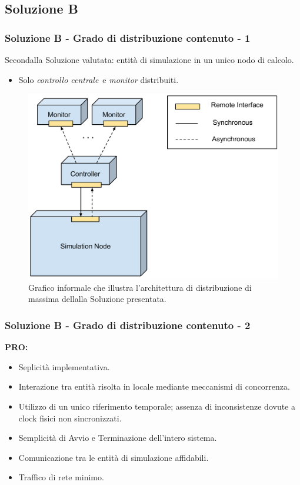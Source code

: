 \documentclass[slidestop,compress,blackandwhite]{beamer}
\newcommand{\ii}[1]{\textit{#1}}
\newcommand{\controller}{\ii{controllo centrale}}
\newcommand{\PRO}{\textbf{PRO:}}
\newcommand{\newframe}[2]{\begin{frame}\frametitle{#1}#2\end{frame}}
\begin{document}
	\subsection{Soluzione B}
	\newframe{Soluzione B - Grado di distribuzione contenuto - 1}{
		Secondalla Soluzione valutata: entità di simulazione in un unico nodo di calcolo.
		\begin{itemize}
			\item Solo \controller~e \ii{monitor} distribuiti.
		\end{itemize}
		
		\begin{figure}
			\includegraphics[scale=0.22,trim=0mm 5mm 0mm 0mm]{imgs/nothing_distributed.pdf}
			\caption{\small Grafico informale che illustra l'architettura di distribuzione di massima dellalla Soluzione presentata.}
		\end{figure}
		
	}
	
	\newframe{Soluzione B - Grado di distribuzione contenuto - 2}{
		\vspace{0.5cm}
		\PRO
			\begin{itemize}
				\item Seplicità implementativa.
				\item Interazione tra entità risolta in locale mediante meccanismi di concorrenza.
				\item Utilizzo di un unico riferimento temporale; assenza di inconsistenze dovute a clock fisici non sincronizzati.
				\item Semplicità di Avvio e Terminazione dell'intero sistema.
				\item Comunicazione tra le entità di simulazione affidabili.
				\item Traffico di rete minimo.
			\end{itemize}
	}
	
\end{document}

